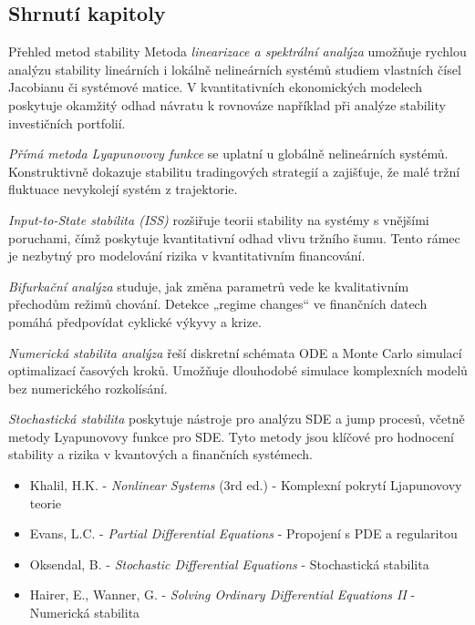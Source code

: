 \spc

\subsection*{Shrnutí kapitoly}

\begin{paragraph}{Přehled metod stability}
    Metoda \emph{linearizace a spektrální analýza} umožňuje rychlou analýzu stability lineárních i lokálně nelineárních systémů studiem vlastních čísel Jacobianu či systémové matice. V kvantitativních ekonomických modelech poskytuje okamžitý odhad návratu k rovnováze například při analýze stability investičních portfolií.
    
    \medskip
    
    \emph{Přímá metoda Lyapunovovy funkce} se uplatní u globálně nelineárních systémů. Konstruktivně dokazuje stabilitu tradingových strategií a zajišťuje, že malé tržní fluktuace nevykolejí systém z trajektorie.
    
    \medskip
    
    \emph{Input-to-State stabilita (ISS)} rozšiřuje teorii stability na systémy s vnějšími poruchami, čímž poskytuje kvantitativní odhad vlivu tržního šumu. Tento rámec je nezbytný pro modelování rizika v kvantitativním financování.
    
    \medskip
    
    \emph{Bifurkační analýza} studuje, jak změna parametrů vede ke kvalitativním přechodům režimů chování. Detekce „regime changes“ ve finančních datech pomáhá předpovídat cyklické výkyvy a krize.
    
    \medskip
    
    \emph{Numerická stabilita analýza} řeší diskretní schémata ODE a Monte Carlo simulací optimalizací časových kroků. Umožňuje dlouhodobé simulace komplexních modelů bez numerického rozkolísání.
    
    \medskip
    
    \emph{Stochastická stabilita} poskytuje nástroje pro analýzu SDE a jump procesů, včetně metody Lyapunovovy funkce pro SDE. Tyto metody jsou klíčové pro hodnocení stability a rizika v kvantových a finančních systémech.
    \end{paragraph}
\begin{itemize}
\item Khalil, H.K. - \emph{Nonlinear Systems} (3rd ed.) - Komplexní pokrytí Ljapunovovy teorie
\item Evans, L.C. - \emph{Partial Differential Equations} - Propojení s PDE a regularitou
\item Oksendal, B. - \emph{Stochastic Differential Equations} - Stochastická stabilita
\item Hairer, E., Wanner, G. - \emph{Solving Ordinary Differential Equations II} - Numerická stabilita
\end{itemize}

